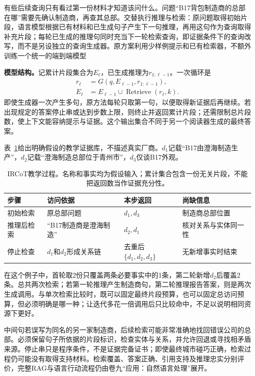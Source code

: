 有些后续查询只有看过第一份材料才知道该问什么。问题“B17背包制造商的总部在哪”需要先确认制造商，再查其总部。交替执行推理与检索：原问题取得初始片段，语言模型根据已有材料和已生成句子产生下一句推理，再用这句作为查询取得补充片段；每轮已生成的推理句同时充当下一轮检索查询，即证据条件下的查询改写，而不是另设独立的查询生成器。原方案利用少样例提示和已有检索器，不额外训练一个统一的端到端模型

\textbf{模型结构。}记累计片段集合为$E_\ell$，已生成推理为$r_{1:\ell-1}$。一次循环是
\begin{equation}
 \begin{split}
 r_\ell&=G(q,E_{\ell-1},r_{1:\ell-1}),\\
 E_\ell&=E_{\ell-1}\cup\operatorname{Retrieve}(r_\ell,k).
 \end{split}
 \label{eq:rs-search-ircot}
\end{equation}
即使生成器一次产生多句，原方法每轮只取第一句，以便取得新证据后再继续。若出现规定的答案停止串或达到步数上限，则终止并返回累计片段；还需限制总片段数，使上下文能容纳提示与证据。这个输出集合不同于另一个阅读器生成的最终答案。

表~\ref{tab:rs-search-evidence-steps}给出明确假设的教学证据库，不描述真实厂商。$d_1$记载“B17由澄海制造生产”，$d_2$记载“澄海制造总部位于青州市”，$d_3$仅谈B17外观。
\begin{table}[htbp]
 \centering
 \begin{tabularx}{\linewidth}{lXXX}
  \toprule
  步骤 & 访问依据 & 本步返回 & 尚缺信息 \\
  \midrule
  初始检索 & 原总部问题 & $d_1,d_3$ & 制造商总部位置 \\
  推理后检索 & “B17制造商是澄海制造” & $d_2,d_1$ & 核对关系与实体同一性 \\
  停止检查 & $d_1$和$d_2$形成关系链 & 去重后$\{d_1,d_2,d_3\}$ & 无新增事实时结束 \\
  \bottomrule
 \end{tabularx}
 \caption{IRCoT教学过程。名称和事实均为假设输入；累计集合包含一份无关片段，不能把返回数当作证据充分性。}
 \label{tab:rs-search-evidence-steps}
\end{table}

在这个例子中，首轮取2份只覆盖两条必要事实中的1条，第二轮新增$d_2$后覆盖2条。总共两次检索；若第一轮推理产生制造商句，第二轮推理报告答案，则是两次生成调用。与单次检索比较时，既可以固定最终片段预算，也可以固定总访问预算，但必须明确是哪一种；让迭代多花一倍调用后只比较命中，不足以说明相同资源下更好。

中间句若误写为同名的另一家制造商，后续检索可能非常准确地找回错误公司的总部。必须保留句子所依据的片段标识，检查实体与关系，并允许回退或寻找相矛盾来源。停止串只是程序条件，不是证据完备证书；即使最终城市碰巧正确，检索过程仍可能没有取得支持材料。检索覆盖、答案正确、引用支持及推理忠实分别评价，完整RAG与语言行动流程仍由卷九“应用：自然语言处理”展开。

